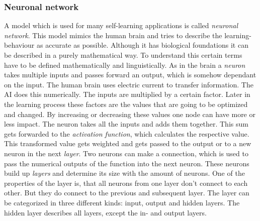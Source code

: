 \documentclass[12pt]{article}
\begin{document}
\subsubsection{Neuronal network}\label{sec:nnmath}
A model which is used for many self-learning applications is called \textit{neuronal network}. 
This model mimics the human brain and tries to describe the learning-behaviour as accurate as possible. Although it has biological foundations it can be described in a purely mathematical way. To understand this certain terms have to be defined mathematically and linguistically.
As in the brain a \textit{neuron} takes multiple inputs and passes forward an output, which is somehow dependant on the input. The human brain uses electric current to transfer information. The AI does this numerically. The inputs are multiplied by a certain factor. Later in the learning process these factors are the values that are going to be optimized and changed. By increasing or decreasing these values one node can have more or less impact. The neuron takes all the inputs and adds them together. This sum gets forwarded to the \textit{activation function}, which calculates the respective value. This transformed value gets weighted and gets passed to the output or to a new neuron in the next \textit{layer}. Two neurons can make a connection, which is used to pass the numerical outputs of the function into the next neuron. These neurons build up \textit{layers} and determine its size with the amount of neurons. One of the properties of the layer is, that all neurons from one layer don't connect to each other. But they do connect to the previous and subsequent layer. The layer can be categorized in three different kinds: input, output and hidden layers. The hidden layer describes all layers, except the in- and output layers. \cite{neuronal_network}\\
\end{document}
